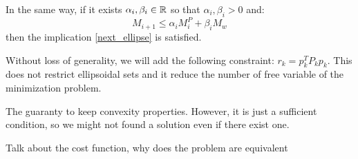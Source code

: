 \newcommand{\ai}{\alpha_i}
\newcommand{\bi}{\beta_i}
In the same way, if it exists $\ai,\bi \in \R$ so that $\ai,\bi>0$ and:
\begin{equation}
M_{i+1} \leq \ai M^P_i + \bi M_w
\end{equation}
then the implication \ref{next_ellipse} is satisfied.

Without loss of generality, we will add the following constraint: $r_k = p_k^T P_k p_k$. This does not restrict ellipsoidal sets and it reduce the number of free variable of the minimization problem.

The \Sproc{} guaranty to keep convexity properties. However, it is just a sufficient condition, so we might not found a solution even if there exist one.

Talk about the cost function, why does the problem are equivalent

\cite{Polyak200815349}
\cite{LMI_book}
